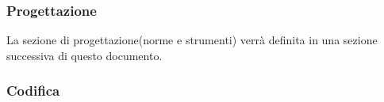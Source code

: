		\subsubsection{Progettazione}
			La sezione di progettazione(norme e strumenti) verrà definita in una sezione successiva di questo documento.
		\subsubsection{Codifica} \label{sec:cod}
						

